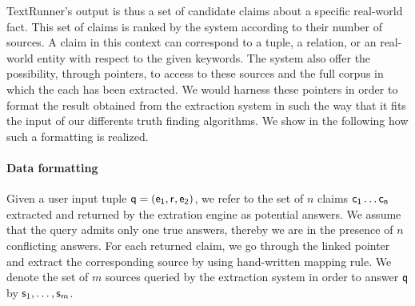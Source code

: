 TextRunner's output is thus a set of candidate claims about a specific real-world fact. This set of claims
is ranked by the system according to their number of sources. A claim in this context can correspond to a tuple,
a relation, or an real-world entity with respect to the given keywords. The system also offer the possibility, 
through pointers, to access to these sources and the full corpus in which the each has been extracted. We would 
harness these pointers in order to format the result obtained from the extraction system  in such the way that it 
fits the input of our differents truth finding algorithms. We show in the following how such a formatting is realized.

\paragraph*{Data formatting}
Given a user input tuple $\mathsf{q}=(\mathsf{e_{1}}, \mathsf{r}_{},\mathsf{e_{2}})$, we refer to the
set of $n$ claims $\mathsf{c_{1}}\ldots \mathsf{c_{n}}$ extracted and returned by the
extration engine as potential answers. 
We assume that the query admits only one true answers, thereby we are in the presence of
$n$ conflicting answers. For each returned claim, we go through the linked pointer and extract the
corresponding source by using hand-written mapping rule. We denote the set of $m$ sources queried by 
the extraction system in order to answer $\mathsf{q}$ by $\mathsf{s}_{1}, \ldots, \mathsf{s}_{m}$.